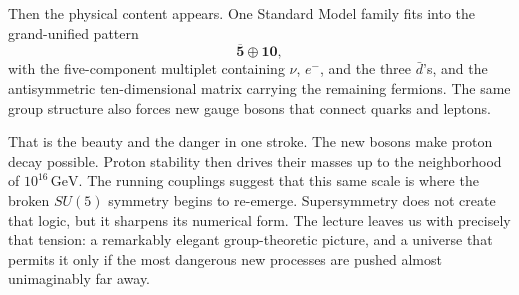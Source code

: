Then the physical content appears. One Standard Model family fits into the grand-unified pattern
\[
\overline{\mathbf 5}\oplus \mathbf{10},
\]
with the five-component multiplet containing \(\nu\), \(e^-\), and the three \(\bar d\)'s, and the antisymmetric ten-dimensional matrix carrying the remaining fermions. The same group structure also forces new gauge bosons that connect quarks and leptons.

That is the beauty and the danger in one stroke. The new bosons make proton decay possible. Proton stability then drives their masses up to the neighborhood of \(10^{16}\,\mathrm{GeV}\). The running couplings suggest that this same scale is where the broken \(SU(5)\) symmetry begins to re-emerge. Supersymmetry does not create that logic, but it sharpens its numerical form. The lecture leaves us with precisely that tension: a remarkably elegant group-theoretic picture, and a universe that permits it only if the most dangerous new processes are pushed almost unimaginably far away.